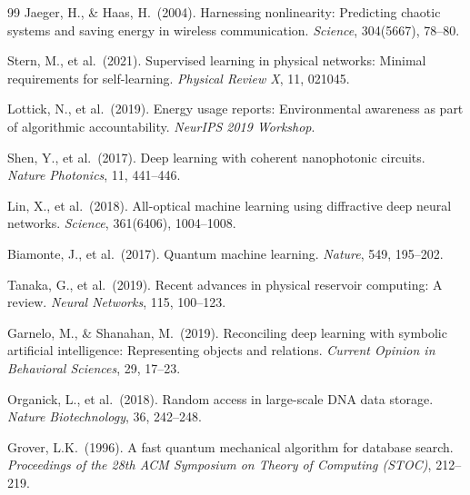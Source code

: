 \documentclass[12pt]{article}
\begin{document}
\begin{thebibliography}{99}
 Jaeger, H., \& Haas, H.\ (2004). Harnessing nonlinearity: Predicting chaotic systems and saving energy in wireless communication. \textit{Science}, 304(5667), 78--80.

 Stern, M., et al.\ (2021). Supervised learning in physical networks: Minimal requirements for self-learning. \textit{Physical Review X}, 11, 021045.

 Lottick, N., et al.\ (2019). Energy usage reports: Environmental awareness as part of algorithmic accountability. \textit{NeurIPS 2019 Workshop}.

 Shen, Y., et al.\ (2017). Deep learning with coherent nanophotonic circuits. \textit{Nature Photonics}, 11, 441--446.

 Lin, X., et al.\ (2018). All-optical machine learning using diffractive deep neural networks. \textit{Science}, 361(6406), 1004--1008.

 Biamonte, J., et al.\ (2017). Quantum machine learning. \textit{Nature}, 549, 195--202.

 Tanaka, G., et al.\ (2019). Recent advances in physical reservoir computing: A review. \textit{Neural Networks}, 115, 100--123.

 Garnelo, M., \& Shanahan, M.\ (2019). Reconciling deep learning with symbolic artificial intelligence: Representing objects and relations. \textit{Current Opinion in Behavioral Sciences}, 29, 17--23.

 Organick, L., et al.\ (2018). Random access in large-scale DNA data storage. \textit{Nature Biotechnology}, 36, 242--248.

 Grover, L.K.\ (1996). A fast quantum mechanical algorithm for database search. \textit{Proceedings of the 28th ACM Symposium on Theory of Computing (STOC)}, 212--219.

\end{thebibliography}
\end{document}
